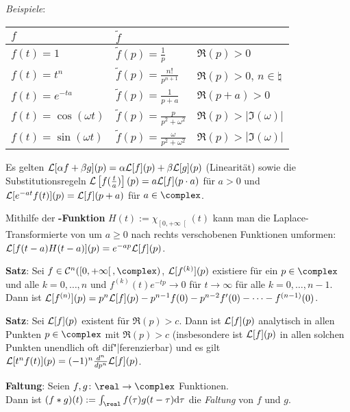 \emph{Beispiele}: \\
\begin{tabular}{l|ll}
    $f$ & $\widetilde{f}$ & \\\hline
    $f(t) = 1$ & $\widetilde{f}(p) = \frac{1}{p}$ & $\Re(p) > 0$ \\
    $f(t) = t^n$ & $\widetilde{f}(p) = \frac{n!}{p^{n+1}}$ &
    $\Re(p) > 0$, $n \in \natural$ \\
    $f(t) = e^{-ta}$ & $\widetilde{f}(p) = \frac{1}{p+a}$ & $\Re(p + a) > 0$ \\
    $f(t) = \cos(\omega t)$ &
    $\widetilde{f}(p) = \frac{p}{p^2 + \omega^2}$ &
    $\Re(p) > |\Im(\omega)|$ \\
    $f(t) = \sin(\omega t)$ &
    $\widetilde{f}(p) = \frac{\omega}{p^2 + \omega^2}$ &
    $\Re(p) > |\Im(\omega)|$ \\
\end{tabular}

Es gelten
$\mathcal{L}[\alpha f + \beta g](p) = \alpha \mathcal{L}[f](p) + \beta \mathcal{L}[g](p)$
(Linearität) sowie die Substitutionsregeln
$\mathcal{L}\left[f(\frac{t}{a})\right](p) = a \mathcal{L}[f](p \cdot a)$ für $a > 0$
und $\mathcal{L}[e^{-at}f(t)](p) = \mathcal{L}[f](p + a)$ für $a \in \complex$.

Mithilfe der \textbf{-Funktion}
$H(t) := \chi_{\left[0, +\infty\right[}(t)$
kann man die Laplace-Transformierte von um $a \ge 0$ nach rechts verschobenen
Funktionen umformen: \\
$\mathcal{L}[f(t - a) H(t - a)](p) = e^{-ap} \mathcal{L}[f](p)$.

\linie

\textbf{Satz}:
Sei $f \in \C^n(\left[0, +\infty\right[, \complex)$,
$\mathcal{L}[f^{(k)}](p)$ existiere für ein $p \in \complex$ und
alle $k = 0, \dotsc, n$ und
$f^{(k)}(t) e^{-tp} \to 0$ für $t \to \infty$
für alle $k = 0, \dotsc, n - 1$. \\
Dann ist $\mathcal{L}[f^{(n)}](p) = p^n \mathcal{L}[f](p) - p^{n-1} f(0) - p^{n-2} f'(0) -
\dotsb - f^{(n-1)}(0)$.

\textbf{Satz}:
Sei $\mathcal{L}[f](p)$ existent für $\Re(p) > c$.
Dann ist $\mathcal{L}[f](p)$ analytisch in allen Punkten $p \in \complex$ mit
$\Re(p) > c$ (insbesondere ist $\mathcal{L}[f](p)$ in allen solchen Punkten
unendlich oft dif"|ferenzierbar) und es gilt
$\mathcal{L}[t^n f(t)](p) = (-1)^n \frac{d^n}{dp^n} \mathcal{L}[f](p)$.

\linie

\textbf{Faltung}:
Seien $f, g\colon \real \rightarrow \complex$ Funktionen. \\
Dann ist $(f \ast g)(t) := \int_\real f(\tau) g(t - \tau) \d\tau$
die \emph{Faltung} von $f$ und $g$.

